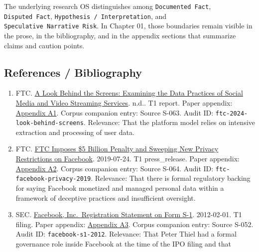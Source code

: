 \documentclass[
  american,
  11pt,
  letterpaper,
]{article}
\providecommand{\tightlist}{%
  \setlength{\itemsep}{0pt}\setlength{\parskip}{0pt}}
\begin{document}
The underlying research OS distinguishes among
\texttt{Documented\ Fact}, \texttt{Disputed\ Fact},
\texttt{Hypothesis\ /\ Interpretation}, and
\texttt{Speculative\ Narrative\ Risk}. In Chapter 01, those boundaries
remain visible in the prose, in the bibliography, and in the appendix
sections that summarize claims and caution points.

\subsection{References / Bibliography}\label{references-bibliography-1}

\begin{enumerate}
\def\labelenumi{\arabic{enumi}.}
\tightlist
\item
  FTC.
  \href{https://www.ftc.gov/reports/look-behind-screens-examining-data-practices-social-media-video-streaming-services}{A
  Look Behind the Screens: Examining the Data Practices of Social Media
  and Video Streaming Services}. n.d.. T1 report. Paper appendix:
  \hyperref[ch-01-appendix-a1-a-look-behind-the-screens-examining-the-data-practices-of-social-media-and-video-streaming-services]{Appendix
  A1}. Corpus companion entry: Source S-063. Audit ID:
  \texttt{ftc-2024-look-behind-screens}. Relevance: That the platform
  model relies on intensive extraction and processing of user data.
\item
  FTC.
  \href{https://www.ftc.gov/news-events/news/press-releases/2019/07/ftc-imposes-5-billion-penalty-sweeping-new-privacy-restrictions-facebook}{FTC
  Imposes \$5 Billion Penalty and Sweeping New Privacy Restrictions on
  Facebook}. 2019-07-24. T1 press\_release. Paper appendix:
  \hyperref[ch-01-appendix-a2-ftc-imposes-5-billion-penalty-and-sweeping-new-privacy-restrictions-on-facebook]{Appendix
  A2}. Corpus companion entry: Source S-064. Audit ID:
  \texttt{ftc-facebook-privacy-2019}. Relevance: That there is formal
  regulatory backing for saying Facebook monetized and managed personal
  data within a framework of deceptive practices and insufficient
  oversight.
\item
  SEC.
  \href{https://www.sec.gov/Archives/edgar/data/1326801/000119312512034517/d287954ds1.htm}{Facebook,
  Inc.~Registration Statement on Form S-1}. 2012-02-01. T1 filing. Paper
  appendix:
  \hyperref[ch-01-appendix-a3-facebook-inc-registration-statement-on-form-s-1]{Appendix
  A3}. Corpus companion entry: Source S-052. Audit ID:
  \texttt{facebook-s1-2012}. Relevance: That Peter Thiel had a formal
  governance role inside Facebook at the time of the IPO filing and that

\end{enumerate}
\end{document}
